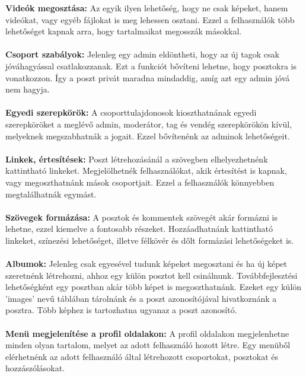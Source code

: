 \documentclass[
]{thesis-ekf}
\theoremstyle{definition}
\theoremstyle{remark}
\begin{document}
\textbf{Videók megosztása:} Az egyik ilyen lehetőség, hogy ne csak képeket, hanem videókat, vagy egyéb fájlokat is meg lehessen osztani. Ezzel a felhasználók több lehetőséget kapnak arra, hogy tartalmaikat megosszák másokkal.
\\\\
\textbf{Csoport szabályok:} Jelenleg egy admin eldöntheti, hogy az új tagok csak jóváhagyással csatlakozzanak. Ezt a funkciót bővíteni lehetne, hogy posztokra is vonatkozzon. Így a poszt privát maradna mindaddig, amíg azt egy admin jóvá nem hagyja.
\\\\
\textbf{Egyedi szerepkörök:} A csoporttulajdonosok kioszthatnának egyedi szerepköröket a meglévő admin, moderátor, tag és vendég szerepkörökön kívül, melyeknek megszabhatnák a jogait. Ezzel bővítenénk az adminok lehetőségeit.
\\\\
\textbf{Linkek, értesítések:} Poszt létrehozásánál a szövegben elhelyezhetnénk kattintható linkeket. Megjelölhetnék felhasználókat, akik értesítést is kapnak, vagy megoszthatnánk mások csoportjait. Ezzel a felhasználók könnyebben megtalálhatnák egymást.
\\\\
\textbf{Szövegek formázása:} A posztok és kommentek szövegét akár formázni is lehetne, ezzel kiemelve a fontosabb részeket. Hozzáadhatnánk kattintható linkeket, színezési lehetőséget, illetve félkövér és dőlt formázási lehetőségeket is.
\\\\
\textbf{Albumok:} Jelenleg csak egyesével tudunk képeket megosztani és ha új képet szeretnénk létrehozni, ahhoz egy külön posztot kell csinálnunk. Továbbfejlesztési lehetőségként egy posztban akár több képet is megoszthatnánk. Ezeket egy külön 'images' nevű táblában tárolnánk és a poszt azonosítójával hivatkoznánk a posztra. Több képhez is tartozhatna ugyanaz a poszt azonosító. 
\\\\
\textbf{Menü megjelenítése a profil oldalakon:} A profil oldalakon megjelenhetne minden olyan tartalom, melyet az adott felhasználó hozott létre. Egy menüből elérhetnénk az adott felhasználó által létrehozott csoportokat, posztokat és hozzászólásokat.
\end{document}
